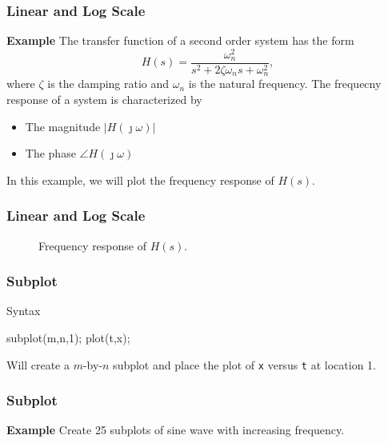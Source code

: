 \documentclass{beamer}  %
\begin{document}
\begin{frame}[fragile]
\frametitle{Linear and Log Scale}
\textbf{Example} 
The transfer function of a second order system has the form
$$H(s) = \frac{\omega_n^2}{s^2 + 2 \zeta \omega_n s + \omega_n^2},$$
where $\zeta$ is the damping ratio and $\omega_n$ is the natural frequency.
\pause
The frequecny response of a system is characterized by
\begin{itemize}
    \item The magnitude $|H(\jmath \omega)|$
    \item The phase $\angle H(\jmath \omega)$
\end{itemize}

In this example, we will plot the frequency response of $H(s)$.

\end{frame}
\begin{frame}[fragile]
\frametitle{Linear and Log Scale}

\setcounter{subfigure}{0}
\begin{figure}
    \centering
    \caption{Frequency response of $H(s)$.}
\end{figure}

\end{frame}
\begin{frame}[fragile]
\frametitle{Subplot}

\begin{block}{Syntax}
          \begin{matlabcodebeamer}[frame=none]
          subplot(m,n,1);
          plot(t,x);
          \end{matlabcodebeamer}
Will create a $m$-by-$n$ subplot and place the plot of \texttt{x} versus \texttt{t} at location 1.
\end{block}
\end{frame}
\begin{frame}[fragile]
\frametitle{Subplot}
\textbf{Example} 
Create 25 subplots of sine wave with increasing frequency.
\setcounter{subfigure}{0}
\begin{figure}
    \centering
\end{figure}

\end{frame}
\end{document}
